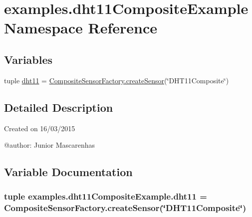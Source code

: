 \hypertarget{namespaceexamples_1_1dht11CompositeExample}{}\section{examples.\+dht11\+Composite\+Example Namespace Reference}
\label{namespaceexamples_1_1dht11CompositeExample}
\subsection*{Variables}
\begin{DoxyCompactItemize}
\item 
tuple \hyperlink{namespaceexamples_1_1dht11CompositeExample_a6868e070252e239f73cce9f8a157ce43}{dht11} = \hyperlink{classconcretefactory_1_1compositeSensorFactory_1_1CompositeSensorFactory_a2d3860525907a2f2d37c98163150ea03}{Composite\+Sensor\+Factory.\+create\+Sensor}(\char`\"{}D\+H\+T11\+Composite\char`\"{})
\end{DoxyCompactItemize}


\subsection{Detailed Description}
\begin{DoxyVerb}Created on 16/03/2015

@author: Junior Mascarenhas
\end{DoxyVerb}
 

\subsection{Variable Documentation}
\hypertarget{namespaceexamples_1_1dht11CompositeExample_a6868e070252e239f73cce9f8a157ce43}{}
\subsubsection[{dht11}]{\setlength{\rightskip}{0pt plus 5cm}tuple examples.\+dht11\+Composite\+Example.\+dht11 = {\bf Composite\+Sensor\+Factory.\+create\+Sensor}(\char`\"{}D\+H\+T11\+Composite\char`\"{})}\label{namespaceexamples_1_1dht11CompositeExample_a6868e070252e239f73cce9f8a157ce43}
